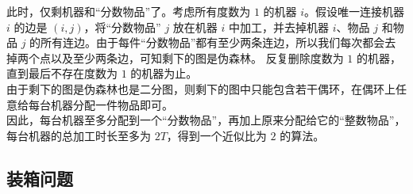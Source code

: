 此时，仅剩机器和“分数物品”了。考虑所有度数为 $1$ 的机器 $i$。假设唯一连接机器 $i$ 的边是 $(i, j)$，将“分数物品” $j$ 放在机器 $i$ 中加工，并去掉机器 $i$、物品 $j$ 和物品 $j$ 的所有连边。由于每件“分数物品”都有至少两条连边，所以我们每次都会去掉两个点以及至少两条边，可知剩下的图是伪森林。
反复删除度数为 $1$ 的机器，直到最后不存在度数为 $1$ 的机器为止。 \\
由于剩下的图是伪森林也是二分图，则剩下的图中只能包含若干偶环，在偶环上任意给每台机器分配一件物品即可。 \\
因此，每台机器至多分配到一个“分数物品”，再加上原来分配给它的“整数物品”，每台机器的总加工时长至多为 $2T$，得到一个近似比为 $2$ 的算法。

\subsection{装箱问题}
